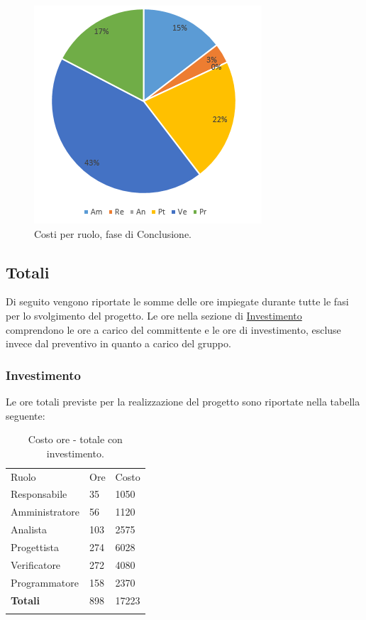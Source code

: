 \documentclass[a4paper]{article}
\begin{document}
			\begin{figure}[H]
				\centering
				\includegraphics[scale=0.7]{pc_costi_conclusione}
				\caption{Costi per ruolo, fase di Conclusione.}
			\end{figure}
			
		\subsection{Totali}
		
			Di seguito vengono riportate le somme delle ore impiegate durante tutte le fasi per lo svolgimento del progetto.
			Le ore nella sezione di \hyperref[SezTotaliInvestimento]{Investimento} comprendono le ore a carico del committente e le 
			ore di investimento, escluse invece dal preventivo in quanto a carico del gruppo. 
			
			\subsubsection{Investimento}
			\label{SezTotaliInvestimento}
				Le ore totali previste per la realizzazione del progetto sono riportate nella tabella seguente:
				
				\begin{table}[H]
					\begin{tabularx}{\textwidth}{Y Y Y}
						Ruolo & Ore & Costo \\
						Responsabile & 35 & 1050 \\
						Amministratore & 56 & 1120 \\
						Analista & 103 & 2575\\
						Progettista & 274 & 6028\\
						Verificatore & 272 & 4080\\
						Programmatore & 158 & 2370 \\
						\textbf{Totali} & 898 & 17223 \\
					\end{tabularx}
				\caption{Costo ore - totale con investimento. } 
				\label{TCTotaleInvestimento}
				\end{table}
				
\end{document}
